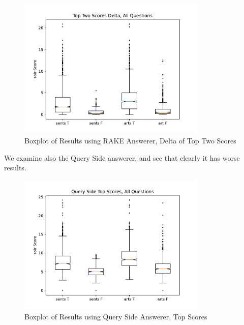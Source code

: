 \documentclass[11pt]{article}
\begin{document}
  \begin{figure}[H]
    \centering
    \includegraphics[width=0.8\textwidth]{fig/bd-all.pdf}
    \caption{Boxplot of Results using RAKE Answerer, Delta of Top Two Scores}
    \label{fig:bd-rake}
  \end{figure}

We examine also the Query Side answerer, and see that clearly it has worse results.

  \begin{figure}[H]
    \centering
    \includegraphics[width=0.8\textwidth]{fig/bt-all_query.pdf}
    \caption{Boxplot of Results using Query Side Answerer, Top Scores}
    \label{fig:bt-rake}
  \end{figure}
\end{document}
